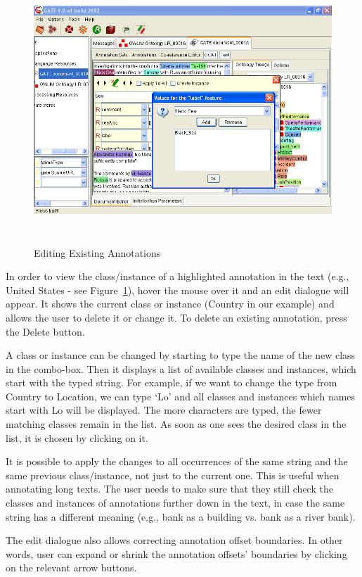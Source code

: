 {\begin{figure}
\includegraphics[height=10cm]{ontology_ocat_edit.png}
\caption{Editing Existing Annotations} \label{fig:ocat:edit}
\end{figure}

In order to view the class/instance of a highlighted annotation in the text
(e.g., United States - see Figure~\ref{fig:ocat:edit}), hover the mouse
over it and an edit dialogue will appear. It shows the current class or instance
(Country in our example) and allows the user to delete it or change
it. To delete an existing annotation, press the Delete button.

A class or instance can be changed by starting to type the name of the
new class in the combo-box. Then it displays a list of available
classes and instances, which start with the typed string. For example,
if we want to change the type from Country to Location, we can type
`Lo' and all classes and instances which names start with Lo will be
displayed. The more characters are typed, the fewer matching classes
remain in the list. As soon as one sees the desired class in the list,
it is chosen by clicking on it.

It is possible to apply the changes to all occurrences of the same
string and the same previous class/instance, not just to the current
one. This is useful when annotating long texts. The user needs to make
sure that they still check the classes and instances of annotations
further down in the text, in case the same string has a different
meaning (e.g., bank as a building vs. bank as a river bank).

The edit dialogue also allows correcting annotation offset boundaries.
In other words, user can expand or shrink the annotation offsets'
boundaries by clicking on the relevant arrow buttons.

}
